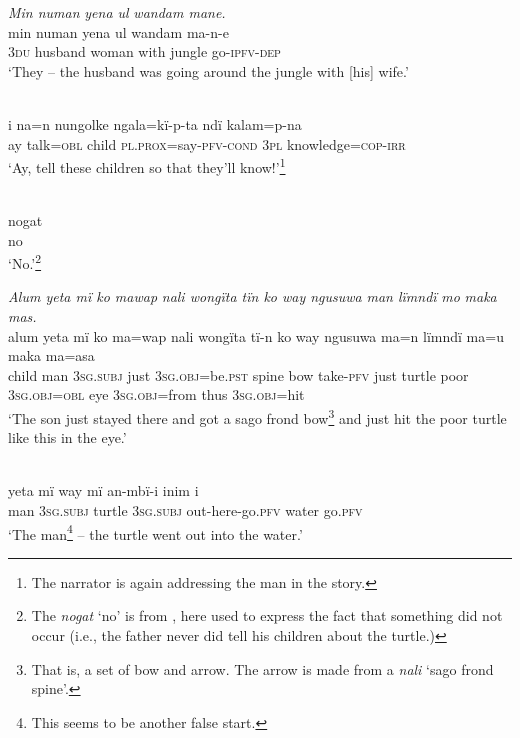 \ex \negmedspace \textit{Min numan} {\textit{yena ul}} \textit{wandam mane.}\\
\gll min  numan    yena    ul wandam  ma{{}-}n{{}-}e\\
3\textsc{du}  husband  woman    with  jungle    go-\textsc{ipfv-dep}\\
\glt ‘They -- the husband was going around the jungle with [his] wife.’

\ex {}\\
\gll i  na{=n} nungolke  ngala{=}kï-p{}-ta        ndï kalam{=}p-{na}\\
ay  talk=\textsc{obl}  child    \textsc{pl.prox}=say-\textsc{pfv-cond}  3\textsc{pl}  knowledge=\textsc{cop}{}-\textsc{irr}\\
\glt ‘Ay, tell these children so that they’ll know!’\footnote{The narrator is again addressing the man in the story.}

\ex {}\\
\gll nogat\\
no\\
\glt ‘No.’\footnote{The  \textit{nogat} ‘no’ is from , here used to express the fact that something did not occur (i.e., the father never did tell his children about the turtle.)}

\ex \negmedspace \textit{Alum yeta mï ko m}{\textit{awap}} \textit{nali wongïta tïn ko way ngusu}{\textit{wa}} \textit{ma}{\textit{n lïmndï}} \textit{m}{\textit{o}} \textit{m}{\textit{a}}\textit{ka mas.}\\
\gll alum  yeta  mï      ko   m{a=wap} nali  wongïta  tï{{}-}n ko  way  ngusu{wa} ma=n      lïmndï m{a=u} m{a}ka ma=asa\\
child  man  3\textsc{sg.subj}  just  3\textsc{sg.obj}=be.\textsc{pst}  spine  bow    take-\textsc{pfv} just  turtle  poor    3\textsc{sg.obj=obl}  eye    3\textsc{sg.obj=}from  thus 3\textsc{sg.obj}=hit\\
\glt ‘{The son just stayed there and got a sago frond bow}\footnote{That is, a set of bow and arrow. The arrow is made from a \textit{nali} ‘sago frond spine’.} and just hit the poor turtle {like this} in the eye.’

\ex {}\\
\gll yeta  mï      way  mï      an{{}-}mbï-{i} inim  i\\
man  3\textsc{sg.subj}  turtle  3\textsc{sg.subj}  out-here-go.\textsc{pfv}  water  go.\textsc{pfv}\\
\glt ‘The man\footnote{This seems to be another false start.} -- the turtle went out into the water.’

